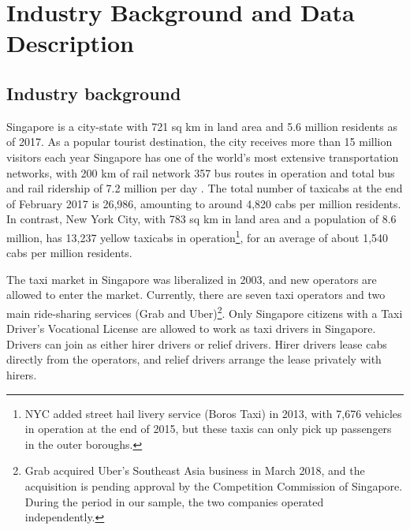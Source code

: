\documentclass[reviewmode]{AEA}
\begin{document}
\section{Industry Background and Data Description}


\subsection{Industry background}

Singapore is a city-state with 721 sq km in land area and 5.6 million residents as of 2017. As a popular tourist destination, the city receives more than 15 million visitors each year
Singapore has one of the world's most extensive transportation networks, with 200 km of rail network
357 bus routes in operation
and total bus and rail ridership of 7.2 million per day%
.
The total number of taxicabs at the end of February 2017 is 26,986, amounting to around 4,820 cabs per million residents. In contrast, New York City, with 783 sq km in land area and a population of 8.6 million, has 13,237 yellow taxicabs in operation\footnote{NYC added street hail livery service (Boros Taxi) in 2013, with 7,676 vehicles in operation at the end of 2015, but these taxis can only pick up passengers in the outer boroughs.}, for an average of about 1,540 cabs per million residents.

The taxi market in Singapore was liberalized in 2003, and new operators are allowed to enter the market. Currently, there are seven taxi operators 
and two main ride-sharing services (Grab and Uber)\footnote{Grab acquired Uber's Southeast Asia business in March 2018, and the acquisition is pending approval by the Competition Commission of Singapore. During the period in our sample, the two companies operated independently.}. Only Singapore citizens with a Taxi Driver's Vocational License are allowed to work as taxi drivers in Singapore. Drivers can join as either hirer drivers or relief drivers. Hirer drivers lease cabs directly from the operators, and relief drivers arrange the lease privately with hirers.
\end{document}
